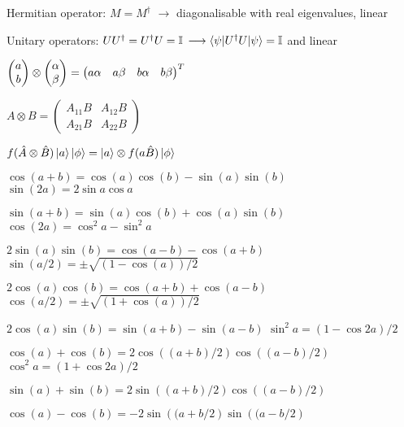 \begin{squishlist}
    \item Hermitian operator: $M = M^{\dagger}$ $\longrightarrow$ diagonalisable with real eigenvalues, linear
    \item Unitary operators: $U U^{\dagger} = U^{\dagger}U = \mathbb{I}$ $\longrightarrow \braket{\psi | U^{\dagger}U|\psi} = \mathbb{I} $ and linear
\end{squishlist}

\begin{squishlist}
\item $\begin{pmatrix} a \\ b \end{pmatrix} \otimes \begin{pmatrix} \alpha \\ \beta \end{pmatrix} = \begin{pmatrix} a \alpha & a \beta & b \alpha & b \beta \end{pmatrix}^T$
    
\item $A \otimes B = \begin{pmatrix} A_{11}B & A_{12}B \\ A_{21}B & A_{22}B \end{pmatrix}$
\item $f(\hat{A} \otimes \hat{B}) \ket{a}\ket{\phi} = \ket{a} \otimes f(a\hat{B})\ket{\phi}$
\end{squishlist}


\begin{squishlist}
    
    \item $\cos(a+b) = \cos(a)\cos(b)-\sin(a)\sin(b)$ \squishsep $\sin(2a) = 2\sin a \cos a$
    \item $\sin(a+b) = \sin(a)\cos(b) + \cos(a)\sin(b)$ \squishsep $\cos(2a) = \cos^2 a - \sin^2 a$
    \item $2\sin(a)\sin(b) = \cos(a-b) - \cos(a+b)$ \smallsquishsep $\sin(a/2) = \pm \sqrt{(1-\cos(a))/2}$
    \item $2\cos(a)\cos(b) = \cos(a+b) + \cos(a-b)$ \smallsquishsep $\cos(a/2) = \pm \sqrt{(1+\cos(a))/2}$
    \item $2\cos(a)\sin(b) = \sin(a+b) - \sin(a-b)$ \smallsquishsep $\sin^2a = (1-\cos 2a)/2$
    \item $\cos(a) + \cos(b) = 2\cos\left((a+b)/2\right)\cos\left((a-b)/2\right)$ \;\squishitem \; $\cos^2 a = (1+\cos 2a) / 2$
    \item $\sin(a) + \sin(b) = 2\sin\left((a+b)/2\right)\cos\left((a-b)/2\right)$ 
    \item $\cos(a) - \cos(b) = -2\sin\left((a+b/2\right)\sin\left((a-b/2\right)$ 
\end{squishlist} 

